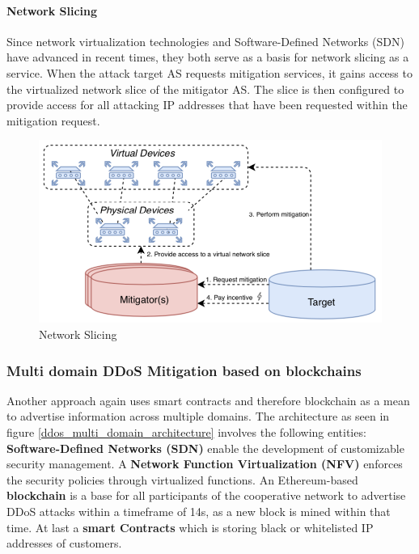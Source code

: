 \paragraph{Network Slicing}
Since network virtualization technologies and Software-Defined Networks (SDN) have advanced in recent times, they both serve as a basis for network slicing as a service. When the attack target AS requests mitigation services, it gains access to the virtualized network slice of the mitigator AS. The slice is then configured to provide access for all attacking IP addresses that have been requested within the mitigation request.
\begin{figure}[ht]
  \begin{center}
  \includegraphics[scale=0.5]{Talk7/img/ddos/cooperative_network_network_slicing}
  \end{center}
  \caption{Network Slicing}
  \label{ddos_network_slicing}
\end{figure}


\subsubsection{Multi domain DDoS Mitigation based on blockchains}
Another approach again uses smart contracts and therefore blockchain as a mean to advertise information across multiple domains. The architecture as seen in figure \ref{ddos_multi_domain_architecture} involves the following entities: \textbf{Software-Defined Networks (SDN)} enable the development of customizable security management. A \textbf{Network Function Virtualization (NFV)} enforces the security policies through virtualized functions. An Ethereum-based \textbf{blockchain} is a base for all participants of the cooperative network to advertise DDoS attacks within a timeframe of 14s, as a new block is mined within that time. At last a \textbf{smart Contracts} which is storing black or whitelisted IP addresses of customers.

